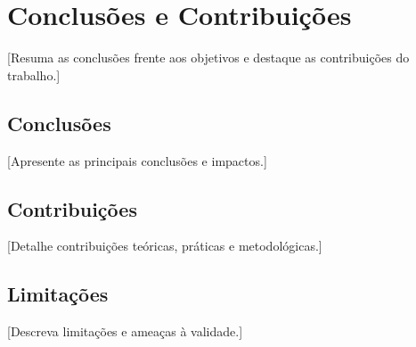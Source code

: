 \section{Conclusões e Contribuições}

[Resuma as conclusões frente aos objetivos e destaque as contribuições do trabalho.]

\subsection{Conclusões}
[Apresente as principais conclusões e impactos.]

\subsection{Contribuições}
[Detalhe contribuições teóricas, práticas e metodológicas.]

\subsection{Limitações}
[Descreva limitações e ameaças à validade.]
